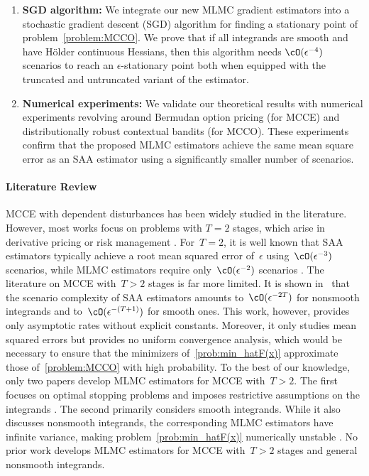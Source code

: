 \documentclass[11pt]{article}
\begin{document}
\begin{enumerate}
    \item {\bf SGD algorithm:} We integrate our new MLMC gradient estimators into a stochastic gradient descent (SGD) algorithm for finding a stationary point of problem~\eqref{problem:MCCO}. We prove that if all integrands are smooth and have H\"older continuous Hessians, then this algorithm needs $\cO(\epsilon^{-4})$ scenarios to reach an $\epsilon$-stationary point both when equipped with the truncated and untruncated variant of the estimator. 
    
    \item {\bf Numerical experiments:} We validate our theoretical results with numerical experiments revolving around Bermudan option pricing (for MCCE) and distributionally robust contextual bandits (for MCCO). These experiments confirm that the proposed MLMC estimators achieve the same mean square error as an SAA estimator using a significantly smaller number of scenarios.
\end{enumerate}

\paragraph{Literature Review} MCCE with dependent disturbances has been widely studied in the literature. However, most works focus on problems with $T=2$ stages, which arise in derivative pricing \cite{bujok2015multilevel, haji2023nested} or risk management \cite{giles2015multilevel, gordy2010nested, broadie2011efficient, giles2019multilevel}. For~$T=2$, it is well known that SAA estimators typically achieve a root mean squared error of~$\epsilon$ using~$\cO(\epsilon^{-3})$ scenarios, while MLMC estimators require only~$\cO(\epsilon^{-2})$ scenarios \citep{giles2018mlmc}. The literature on MCCE with~$T>2$ stages is far more limited. It is shown in~\citep{rainforth2018nesting} that the scenario complexity of SAA estimators amounts to~$\cO(\epsilon^{-2T})$ for nonsmooth integrands and to~$\cO(\epsilon^{-(T+1)})$ for smooth ones. This work, however, provides only asymptotic rates without explicit constants. Moreover, it only studies mean squared errors but provides no uniform convergence analysis, which would be necessary to ensure that the minimizers of~\eqref{prob:min_hatF(x)} approximate those of~\eqref{problem:MCCO} with high probability. To the best of our knowledge, only two papers develop MLMC estimators for MCCE with~$T>2$. The first focuses on optimal stopping problems and imposes restrictive assumptions on the integrands \citep{zhou2022unbiased}. The second primarily considers smooth integrands. While it also discusses nonsmooth integrands, the corresponding MLMC estimators have infinite variance, making problem~\eqref{prob:min_hatF(x)} numerically unstable \citep{syed2023optimal}. No prior work develops MLMC estimators for MCCE with~$T>2$ stages and general nonsmooth integrands.
\end{document}
